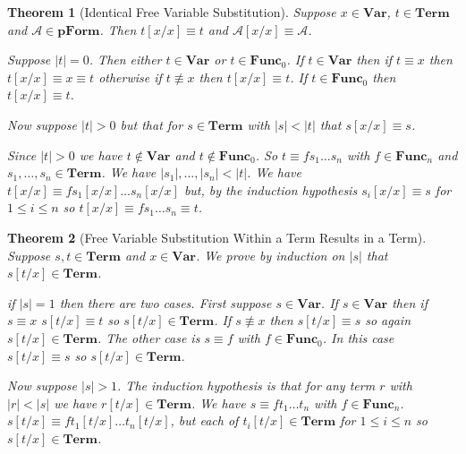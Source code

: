\documentclass[12pt]{article}
\theoremstyle{break}
\theoremstyle{break}
\newtheorem{theorem}{Theorem}[section]
\theoremstyle{break}
\theoremstyle{break}
\theoremstyle{break}
\newtheorem{informal definition}[definition]{Informal Definition}
\newcommand{\mc}[1]{\mathcal{#1}}
\begin{document}
\begin{theorem}[Identical Free Variable Substitution]
\label{thm:idenfvsub}
Suppose $x\in\textbf{Var}$, $t\in\textbf{Term}$ and $\mc{A}\in\textbf{pForm}$.
Then $t[x/x] \equiv t$ and $\mc{A}[x/x]\equiv \mc{A}$.

Suppose $|t| = 0$.
Then either $t\in \textbf{Var}$ or $t\in\textbf{Func}_0$.
If $t\in\textbf{Var}$ then if $t\equiv x$ then $t[x/x] \equiv x \equiv t$ otherwise if $t \not \equiv x$ then $t[x/x] \equiv t$.
If $t\in\textbf{Func}_0$ then $t[x/x] \equiv t$.

Now suppose $|t|>0$ but that for $s\in\textbf{Term}$ with $|s|<|t|$ that $s[x/x] \equiv s$.

Since $|t|>0$ we have $t\not \in \textbf{Var}$ and $t\not \in \textbf{Func}_0$.
So $t\equiv fs_1\ldots s_n$ with $f\in\textbf{Func}_n$ and $s_1,\ldots, s_n\in\textbf{Term}$.
We have $|s_1|,\ldots,|s_n| < |t|$.
We have $t[x/x] \equiv f s_1[x/x]\ldots s_n[x/x]$ but, by the induction hypothesis $s_i[x/x] \equiv s$ for $1\le i \le n$ so $t[x/x]\equiv fs_1\ldots s_n \equiv t$.
\end{theorem}



\begin{theorem}[Free Variable Substitution Within a Term Results in a Term]
\label{thm:fvsubintermgivesterm}
Suppose $s, t\in\textbf{Term}$ and $x\in\textbf{Var}$.
We prove by induction on $|s|$ that $s[t/x] \in \textbf{Term}$.

if $|s| = 1$ then there are two cases.
First suppose $s\in \textbf{Var}$.
If $s\in \textbf{Var}$ then if $s\equiv x$ $s[t/x] \equiv t$ so $s[t/x]\in\textbf{Term}$.
If $s \not \equiv x$ then $s[t/x] \equiv s$ so again $s[t/x] \in \textbf{Term}$.
The other case is $s\equiv f$ with $f\in \textbf{Func}_0$.
In this case $s[t/x] \equiv s$ so $s[t/x] \in \textbf{Term}$.

Now suppose $|s| > 1$.
The induction hypothesis is that for any term $r$ with $|r|<|s|$ we have $r[t/x] \in \textbf{Term}$.
We have $s\equiv ft_1\ldots t_n$ with $f\in\textbf{Func}_n$. $s[t/x] \equiv f t_1[t/x]\ldots t_n[t/x]$, but each of $t_i[t/x]\in\textbf{Term}$ for $1\le i \le n$ so $s[t/x]\in\textbf{Term}$.
\end{theorem}
\end{document}
